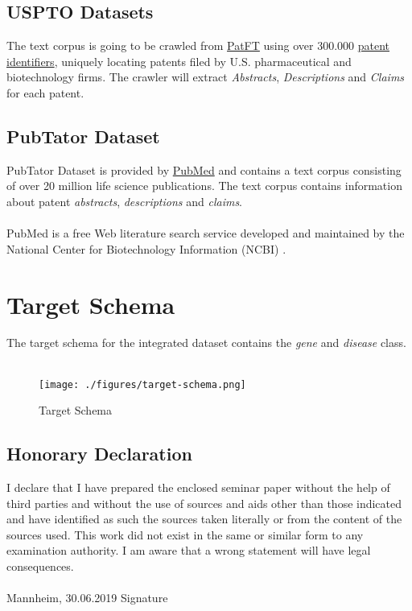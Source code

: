 \documentclass[11pt,titlepage,oneside,openany]{book}
\begin{document}
\section{USPTO Datasets}
\label{usptods}
The text corpus is going to be crawled from \href{http://patft.uspto.gov/netahtml/PTO/index.html}{PatFT} using over 300.000 \href{https://nahorgebre.s3.amazonaws.com/US_Patents_1985_2016_313392.csv}{patent identifiers}, uniquely locating patents filed by U.S. pharmaceutical and biotechnology firms. The crawler will extract \textit{Abstracts}, \textit{Descriptions} and \textit{Claims} for each patent.
\\

\section{PubTator Dataset}
\label{pubtator}
PubTator Dataset is provided by \href{https://www.ncbi.nlm.nih.gov/pubmed/}{PubMed} and contains a text corpus consisting of over 20 million life science publications. The text corpus contains information about patent \textit{abstracts}, \textit{descriptions} and \textit{claims}. 
\\
\\
PubMed is a free Web literature search service developed and maintained by the National Center for Biotechnology Information (NCBI) \cite{Lu2011PubMedAB}.

\chapter{Target Schema}
\label{cha:targets}
The target schema for the integrated dataset contains the \textit{gene} and \textit{disease} class.
\\
\\
\begin{figure}
	\begin{center}
	\texttt{[image: ./figures/target-schema.png]}
	\caption[Target Schema]{Target Schema}
	\label{fig:target-schema}
	\end{center}
\end{figure}	


\newpage

\pagestyle{empty}

\section*{Honorary Declaration}
I declare that I have prepared the enclosed seminar paper without the help of third parties and without the use of sources and aids other than those indicated and have identified as such the sources taken literally or from the content of the sources used. This work did not exist in the same or similar form to any examination authority. I am aware that a wrong statement will have legal consequences.
\\
\\

\noindent
Mannheim, 30.06.2019 \hspace{4cm} Signature
\end{document}
